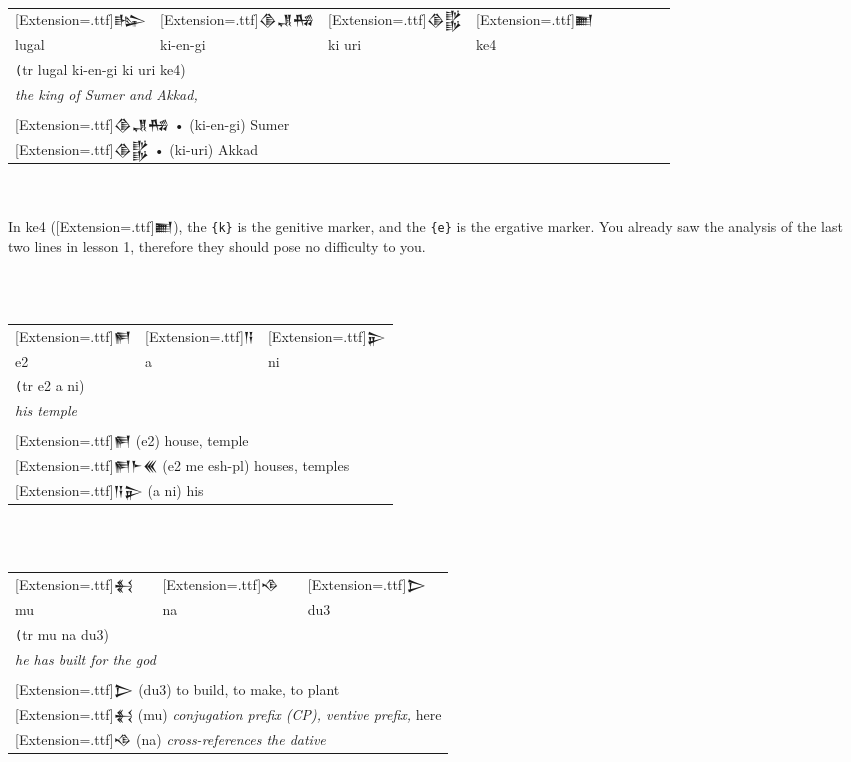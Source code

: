\documentclass[a4paper,12pt]{book}
\newcommand{\fcn}{\setmainfont{Akkadian}[Extension=.ttf]}
\newcommand{\fcm}{\large\setmainfont{Akkadian}[Extension=.ttf]}
\begin{document}
\verb||\\
 \begin{tabular}[!h]{l l l l l l l l l}
   \fcm 𒈗 &\fcm 𒆠𒂗𒄀
   &\fcm 𒆠𒌵 &\fcm 𒆤 \\
   lugal & ki-en-gi & ki uri & ke4\\
   \multicolumn{4}{l}{\texttt (tr lugal ki-en-gi ki uri ke4)}\\
   \multicolumn{4}{l}{\em the king of Sumer and Akkad,}\\
   \hline\\
     \multicolumn{4}{l}{{\fcn 𒆠𒂗𒄀} • (ki-en-gi) Sumer }\\
  \multicolumn{4}{l}{{\fcn 𒆠𒌵} • (ki-uri) Akkad }\\
 \end{tabular}\verb||\\

 \verb||\\
 In ke4 ({\fcn 𒆤}), the \verb|{k}| is the
 genitive marker, and the \verb|{e}| is the ergative marker.
 You already saw the analysis of the last two
 lines in lesson 1, therefore they should pose
 no difficulty to you.
 
 \verb||\\
 \verb||\\
\begin{tabular}[!h]{l l l}
\fcm 𒂍
&\fcm 𒀀 &\fcm 𒉌\\
  e2 & a & ni\\
\multicolumn{3}{l}{\texttt (tr e2 a ni)}\\
\multicolumn{3}{l}{\em his temple}\\
\hline\\
\multicolumn{3}{l}{{\fcn 𒂍}
  (e2)  house, temple}\\
\multicolumn{3}{l}{{\fcn 𒂍𒈨𒌍}
                    (e2 me esh-pl) houses, temples }\\
\multicolumn{3}{l}{{\fcn 𒀀𒉌}
                    (a ni) his }\\
\end{tabular}


\noindent
\verb||\\
\verb||\\
\begin{tabular}[!h]{l l l}
\fcm 𒈬
&\fcm 𒈾 &\fcm 𒆕\\
  mu & na & du3\\
\multicolumn{3}{l}{\texttt (tr mu na du3)}\\
\multicolumn{3}{l}{\em he has built for the god}\\
\hline\\
\multicolumn{3}{l}{{\fcn 𒆕}
                    (du3) to build, to make, to plant }\\
\multicolumn{3}{l}{{\fcn 𒈬}
  (mu) {\em conjugation prefix (CP), ventive prefix,}
            here}\\
\multicolumn{3}{l}{{\fcn 𒈾}
     (na) {\em cross-references the dative} }\\
\end{tabular}
\end{document}
